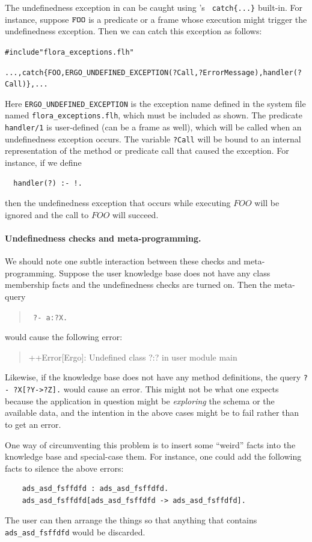 \documentclass[11pt]{article}
\newcommand{\ERGO}{\mbox{\smaller{\ensuremath{\cal{E}}\smaller{{\sc{RGO}}}}}\xspace}
\newcommand{\FLSYSTEM}{\ERGO}
\newcommand{\FLUNDEFEXCEPTION}{ERGO\_UNDEFINED\_EXCEPTION}
\newcommand{\errorsystem}{Ergo}
\begin{document}
The undefinedness exception in \FLSYSTEM can be caught using \FLSYSTEM's {\tt
  catch\{...\}} built-in. For instance, suppose
$\tt FOO$ is a predicate or a frame whose execution might trigger the
undefinedness exception. Then we can catch this exception as follows:
\begin{alltt}
#include "flora_exceptions.flh"

  ..., catch\{FOO, {\smaller\FLUNDEFEXCEPTION}(?Call,?ErrorMessage), handler(?Call)\}, ...
\end{alltt}
Here \texttt{\FLUNDEFEXCEPTION} is the exception name defined in the
\FLSYSTEM system file named {\tt flora\_exceptions.flh}, which must be included as
shown.
The predicate {\tt handler/1} is user-defined (can be a frame as well),
which will be called when an undefinedness exception occurs. The variable
{\tt ?Call} will be bound to an internal representation of the method or
predicate call that caused the exception. For instance, if we define
\begin{verbatim}
  handler(?) :- !.  
\end{verbatim}
then the undefinedness exception that occurs while executing $FOO$ will be
ignored and the call to $FOO$ will succeed.


\paragraph{Undefinedness checks and meta-programming.}
We should note one subtle interaction between these checks and
meta-programming. Suppose the user knowledge base does not have any class membership
facts and the undefinedness checks are turned on. Then the meta-query
\begin{quote}
 {\tt
       ?- a:?X.
 }
\end{quote}
would cause the following error:
\begin{quote}
 ++Error[\errorsystem]: Undefined class ?:? in user module main  
\end{quote}
Likewise, if the knowledge base does not have any method definitions,
the query {\tt ?- ?X[?Y->?Z].} would cause an error. This might not
be what one expects because the application in question might be
\emph{exploring} the schema or the available data, and the intention in the
above cases might be to fail rather than to get an error.

One way of circumventing this problem is to insert some ``weird''
facts into the
knowledge base and special-case them. For instance, one could add
the following facts to silence the above errors:
\begin{verbatim}
    ads_asd_fsffdfd : ads_asd_fsffdfd.
    ads_asd_fsffdfd[ads_asd_fsffdfd -> ads_asd_fsffdfd].
\end{verbatim}
The user can then arrange the things so that anything that contains
{\tt ads\_asd\_fsffdfd} would be discarded.
\end{document}
